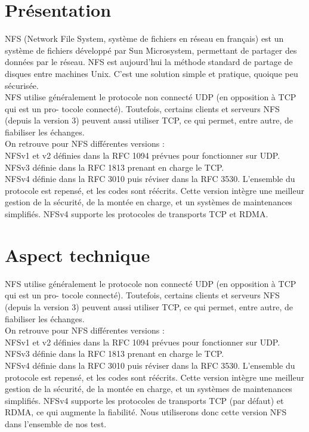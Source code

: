 \documentclass[12pt]{report}
\begin{document}
		\section{Présentation}

		NFS (Network File System, système de fichiers en réseau en français) est un système de fichiers développé par Sun Microsystem,
		permettant de partager des données par le réseau. NFS est aujourd’hui la méthode standard de partage de disques entre machines Unix. 
		C’est une solution simple et pratique, quoique peu sécurisée.\\
		
		NFS utilise généralement le protocole non connecté UDP (en opposition à TCP qui est un pro-
    tocole connecté). Toutefois, certains clients et serveurs NFS (depuis la version 3) peuvent aussi
    utiliser TCP, ce qui permet, entre autre, de fiabiliser les échanges.\\

    On retrouve pour NFS différentes versions :\\
    NFSv1 et v2 définies dans la RFC 1094 prévues pour fonctionner sur UDP.\\
    NFSv3 définie dans la RFC 1813 prenant en charge le TCP.\\
    NFSv4 définie dans la RFC 3010 puis réviser dans la RFC 3530. L'ensemble du protocole est repensé, et les codes sont réécrits.
    Cette version intègre une meilleur gestion de la sécurité, de la montée en charge, et un systèmes de maintenances simplifiés.
    NFSv4 supporte les protocoles de transports TCP et RDMA.\\
\section{Aspect technique}
		
		NFS utilise généralement le protocole non connecté UDP (en opposition à TCP qui est un pro-
    tocole connecté). Toutefois, certains clients et serveurs NFS (depuis la version 3) peuvent aussi
    utiliser TCP, ce qui permet, entre autre, de fiabiliser les échanges.\\

    On retrouve pour NFS différentes versions :\\
    NFSv1 et v2 définies dans la RFC 1094 prévues pour fonctionner sur UDP.\\
    NFSv3 définie dans la RFC 1813 prenant en charge le TCP.\\
    NFSv4 définie dans la RFC 3010 puis réviser dans la RFC 3530. L'ensemble du protocole est repensé, et les codes sont réécrits.
    Cette version intègre une meilleur gestion de la sécurité, de la montée en charge, et un systèmes de maintenances simplifiés.
    NFSv4 supporte les protocoles de transports TCP (par défaut) et RDMA, ce qui augmente la fiabilité. Nous utiliserons donc cette version
    NFS dans l'ensemble de nos test.\\
    
\end{document}
